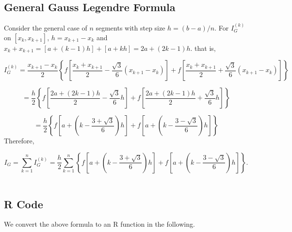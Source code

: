\documentclass[
]{book}
\begin{document}
\hypertarget{general-gauss-legendre-formula}{%
\subsection{General Gauss Legendre Formula}\label{general-gauss-legendre-formula}}

Consider the general case of \(n\) segments with step size \(h = (b - a)/n\). For \(I^{(k)}_G\) on \([x_k, x_{k+1}]\), \(h = x_{k+1} - x_k\) and \(x_k+x_{k+1} = [a + (k-1)h]+[a +kh] = 2a +(2k-1)h\). that is,

\[
 I^{(k)}_G = \frac{x_{k+1}-x_k}{2}\left\{ f\left[\frac{x_k+x_{k+1}}{2}-\frac{\sqrt{3}}{6}(x_{k+1}-x_k) \right] + f\left[\frac{x_k+x_{k+1}}{2}+\frac{\sqrt{3}}{6}(x_{k+1}-x_k) \right]\right\}
\]

\[
= \frac{h}{2}\left\{ f\left[\frac{2a +(2k-1)h}{2}-\frac{\sqrt{3}}{6}h \right] + f\left[\frac{2a +(2k-1)h}{2}+\frac{\sqrt{3}}{6}h \right]\right\}
\]

\[
= \frac{h}{2}\left\{ f\left[a +\left(k-\frac{3+\sqrt{3}}{6}\right)h \right] +  f\left[a +\left(k-\frac{3 - \sqrt{3}}{6}\right)h \right]\right\}
\]
Therefore,

\[
I_G = \sum_{k=1}^n I_G^{(k)} = \frac{h}{2}\sum_{k=1}^n \left\{ f\left[a +\left(k-\frac{3+\sqrt{3}}{6}\right)h \right] +  f\left[a +\left(k-\frac{3 - \sqrt{3}}{6}\right)h \right]\right\}.
\]\\

\hypertarget{r-code-1}{%
\subsection{R Code}\label{r-code-1}}

We convert the above formula to an R function in the following.
\end{document}
